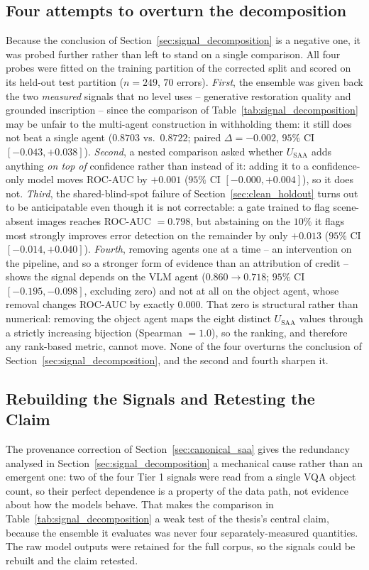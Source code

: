 \documentclass[12pt,a4paper]{report}
\begin{document}
\subsection{Four attempts to overturn the decomposition}
\label{sec:moved_four}
Because the conclusion of Section~\ref{sec:signal_decomposition} is a negative one, it was probed further rather than left to stand on a single comparison. All four probes were fitted on the training partition of the corrected split and scored on its held-out test partition ($n=249$, $70$ errors). \emph{First}, the ensemble was given back the two \emph{measured} signals that no level uses -- generative restoration quality and grounded inscription -- since the comparison of Table~\ref{tab:signal_decomposition} may be unfair to the multi-agent construction in withholding them: it still does not beat a single agent ($0.8703$ vs.\ $0.8722$; paired $\Delta = -0.002$, $95\%$ CI $[-0.043, +0.038]$). \emph{Second}, a nested comparison asked whether $U_{\text{SAA}}$ adds anything \emph{on top of} confidence rather than instead of it: adding it to a confidence-only model moves ROC-AUC by $+0.001$ ($95\%$ CI $[-0.000, +0.004]$), so it does not. \emph{Third}, the shared-blind-spot failure of Section~\ref{sec:clean_holdout} turns out to be anticipatable even though it is not correctable: a gate trained to flag scene-absent images reaches ROC-AUC $=0.798$, but abstaining on the $10\%$ it flags most strongly improves error detection on the remainder by only $+0.013$ ($95\%$ CI $[-0.014, +0.040]$). \emph{Fourth}, removing agents one at a time -- an intervention on the pipeline, and so a stronger form of evidence than an attribution of credit -- shows the signal depends on the VLM agent ($0.860 \to 0.718$; $95\%$ CI $[-0.195, -0.098]$, excluding zero) and not at all on the object agent, whose removal changes ROC-AUC by exactly $0.000$. That zero is structural rather than numerical: removing the object agent maps the eight distinct $U_{\text{SAA}}$ values through a strictly increasing bijection (Spearman $=1.0$), so the ranking, and therefore any rank-based metric, cannot move. None of the four overturns the conclusion of Section~\ref{sec:signal_decomposition}, and the second and fourth sharpen it.

\subsection{Rebuilding the Signals and Retesting the Claim}
\label{sec:signal_rebuild}
The provenance correction of Section~\ref{sec:canonical_saa} gives the redundancy analysed in Section~\ref{sec:signal_decomposition} a mechanical cause rather than an emergent one: two of the four Tier 1 signals were read from a single VQA object count, so their perfect dependence is a property of the data path, not evidence about how the models behave. That makes the comparison in Table~\ref{tab:signal_decomposition} a weak test of the thesis's central claim, because the ensemble it evaluates was never four separately-measured quantities. The raw model outputs were retained for the full corpus, so the signals could be rebuilt and the claim retested.
\end{document}
